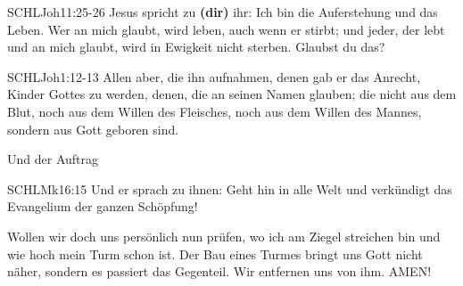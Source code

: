 \documentclass[14pt]{../../inc/mybib}
\begin{document}
    \begin{bibelbox}{SCHL}{Joh}{11:25-26}
        Jesus spricht zu \textbf{(dir)} ihr: Ich bin die Auferstehung und das Leben. Wer an mich glaubt, wird leben, auch wenn er stirbt; und jeder, der lebt und an mich glaubt, wird in Ewigkeit nicht sterben. Glaubst du das?
    \end{bibelbox} 
    \begin{bibelbox}{SCHL}{Joh}{1:12-13}
        Allen aber, die ihn aufnahmen, denen gab er das Anrecht, Kinder Gottes zu werden, denen, die an seinen Namen glauben;
        die nicht aus dem Blut, noch aus dem Willen des Fleisches, noch aus dem Willen des Mannes, sondern aus Gott geboren sind.
    \end{bibelbox}     
    Und der Auftrag
    \begin{bibelbox}{SCHL}{Mk}{16:15}
        Und er sprach zu ihnen: Geht hin in alle Welt und verkündigt das Evangelium der ganzen Schöpfung!
    \end{bibelbox} 
    Wollen wir doch uns persönlich nun prüfen, wo ich am Ziegel streichen bin und wie hoch mein Turm schon ist. Der Bau eines Turmes bringt uns Gott nicht näher, sondern es passiert das Gegenteil. Wir entfernen uns von ihm. AMEN!
    
    \beten{}   
    
\end{document}
